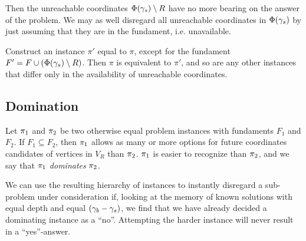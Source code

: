 Then the unreachable coordinates $\Phi(\gamma_s) \setminus R$ have no more bearing on the answer of the problem. We may as well disregard all unreachable coordinates in $\Phi(\gamma_s)$ by just assuming that they are in the fundament, i.e. unavailable.

Construct an instance $\pi'$ equal to $\pi$, except for the fundament $F' = F \cup (\Phi(\gamma_s) \setminus R)$. Then $\pi$ is equivalent to $\pi'$, and so are any other instances that differ only in the availability of unreachable coordinates.

\subsection{Domination}

Let $\pi_1$ and $\pi_2$ be two otherwise equal problem instances with fundaments $F_1$ and $F_2$. If $F_1 \subseteq F_2$, then $\pi_1$ allows as many or more options for future coordinates candidates of vertices in $V_R$ than $\pi_2$. $\pi_1$ is easier to recognize than $\pi_2$, and we say that $\pi_1$ \emph{dominates} $\pi_2$.

We can use the resulting hierarchy of instances to instantly disregard a sub-problem under consideration if, looking at the memory of known solutions with equal depth and equal $(\gamma_b-\gamma_s)$, we find that we have already decided a dominating instance as a ``no''. Attempting the harder instance will never result in a ``yes''-answer.

